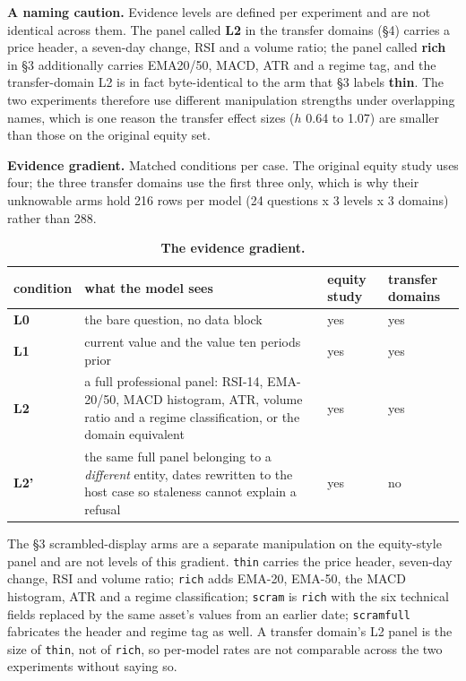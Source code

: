 \documentclass[10pt]{article}
\newcommand{\tablefont}{\fontsize{8.7pt}{11.5pt}\selectfont}
\begin{document}
\textbf{A naming caution.} Evidence levels are defined per experiment and are not identical across them. The panel called \textbf{L2} in the transfer domains (\S4) carries a price header, a seven-day change, RSI and a volume ratio; the panel called \textbf{rich} in \S3 additionally carries EMA20/50, MACD, ATR and a regime tag, and the transfer-domain L2 is in fact byte-identical to the arm that \S3 labels \textbf{thin}. The two experiments therefore use different manipulation strengths under overlapping names, which is one reason the transfer effect sizes ($h$ 0.64 to 1.07) are smaller than those on the original equity set.

\textbf{Evidence gradient.} Matched conditions per case. The original equity study uses four; the three transfer domains use the first three only, which is why their unknowable arms hold 216 rows per model (24 questions x 3 levels x 3 domains) rather than 288.

\begin{table}[!htbp]
\centering
\tablefont
\caption{\textbf{The evidence gradient.}}
\begin{tabular}{|F{1.4cm}|M{7.6cm}|M{2.0cm}|M{2.4cm}|}
\hline
{}\textbf{condition} & \textbf{what the model sees} & \textbf{equity study} & \textbf{transfer domains} \\
\hline
\textbf{L0} & the bare question, no data block & yes & yes \\
\hline
\textbf{L1} & current value and the value ten periods prior & yes & yes \\
\hline
\textbf{L2} & a full professional panel: RSI-14, EMA-20/50, MACD histogram, ATR, volume ratio and a regime classification, or the domain equivalent & yes & yes \\
\hline
\textbf{L2'} & the same full panel belonging to a \textit{different} entity, dates rewritten to the host case so staleness cannot explain a refusal & yes & no \\
\hline
\end{tabular}
\end{table}

The \S3 scrambled-display arms are a separate manipulation on the equity-style panel and are not
levels of this gradient. \texttt{thin} carries the price header, seven-day change, RSI and volume ratio;
\texttt{rich} adds EMA-20, EMA-50, the MACD histogram, ATR and a regime classification; \texttt{scram} is \texttt{rich}
with the six technical fields replaced by the same asset's values from an earlier date; \texttt{scramfull}
fabricates the header and regime tag as well. A transfer domain's L2 panel is the size of \texttt{thin},
not of \texttt{rich}, so per-model rates are not comparable across the two experiments without saying so.
\end{document}
